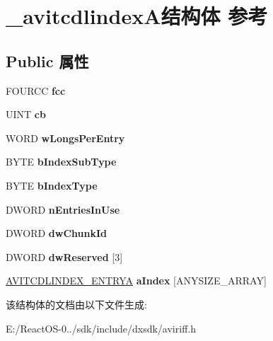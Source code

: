 \hypertarget{struct__avitcdlindex_a}{}\section{\+\_\+avitcdlindex\+A结构体 参考}
\label{struct__avitcdlindex_a}
\subsection*{Public 属性}
\begin{DoxyCompactItemize}
\item 
\mbox{\label{struct__avitcdlindex_a_a3999cda52f2cdfcffe06c39b07a772a9}} 
F\+O\+U\+R\+CC {\bfseries fcc}
\item 
\mbox{\label{struct__avitcdlindex_a_ad0e310ddcd02912bb4d1e75865d6841c}} 
U\+I\+NT {\bfseries cb}
\item 
\mbox{\label{struct__avitcdlindex_a_a2a14c5647c440d0e2e6b4eab4e2fa223}} 
W\+O\+RD {\bfseries w\+Longs\+Per\+Entry}
\item 
\mbox{\label{struct__avitcdlindex_a_a44056b04b997503db763a5387288e746}} 
B\+Y\+TE {\bfseries b\+Index\+Sub\+Type}
\item 
\mbox{\label{struct__avitcdlindex_a_ab743f30d5e3907ba65001782d4637a17}} 
B\+Y\+TE {\bfseries b\+Index\+Type}
\item 
\mbox{\label{struct__avitcdlindex_a_a111919190979ba49718d7816775bd87a}} 
D\+W\+O\+RD {\bfseries n\+Entries\+In\+Use}
\item 
\mbox{\label{struct__avitcdlindex_a_a4dfcaa0fa5aed01a2b3a6a1726834d6e}} 
D\+W\+O\+RD {\bfseries dw\+Chunk\+Id}
\item 
\mbox{\label{struct__avitcdlindex_a_a87e279e807c5406581c4d764bbd72477}} 
D\+W\+O\+RD {\bfseries dw\+Reserved} \mbox{[}3\mbox{]}
\item 
\mbox{\label{struct__avitcdlindex_a_a8af953bc4f19d8ec47156865e47b4c3f}} 
\hyperlink{struct__avitcdlindex__entry_a}{A\+V\+I\+T\+C\+D\+L\+I\+N\+D\+E\+X\+\_\+\+E\+N\+T\+R\+YA} {\bfseries a\+Index} \mbox{[}A\+N\+Y\+S\+I\+Z\+E\+\_\+\+A\+R\+R\+AY\mbox{]}
\end{DoxyCompactItemize}


该结构体的文档由以下文件生成\+:\begin{DoxyCompactItemize}
\item 
E\+:/\+React\+O\+S-\/0../sdk/include/dxsdk/aviriff.\+h\end{DoxyCompactItemize}
